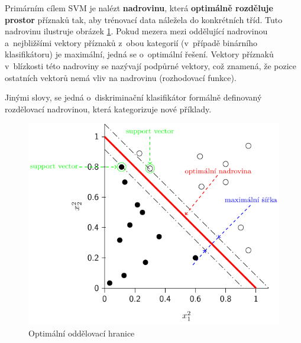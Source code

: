 Primárním cílem SVM je nalézt \textbf{nadrovinu}, která \textbf{optimálně rozděluje prostor} příznaků tak, aby trénovací data náležela do konkrétních tříd. Tuto nadrovinu ilustruje obrázek \ref{fig:svm}. Pokud mezera mezi oddělující nadrovinou a~nejbližšími vektory příznaků z~obou kategorií (v~případě binárního klasifikátoru) je maximální, jedná se o~optimální řešení. Vektory příznaků v~blízkosti této nadroviny se nazývají podpůrné vektory, což znamená, že pozice ostatních vektorů nemá vliv na nadrovinu (rozhodovací funkce). 

Jinými slovy, se jedná o~diskriminační klasifikátor formálně definovaný rozdělovací nadrovinou, která kategorizuje nové příklady.
\begin{figure}[H]
\centering
\includegraphics[width=.71\linewidth]{assets/9_svm.pdf}
\caption{Optimální oddělovací hranice}
\label{fig:svm}
\end{figure}

